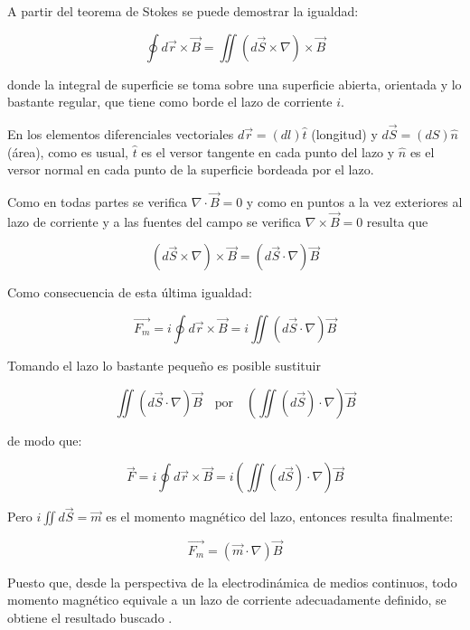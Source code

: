 A partir del teorema de Stokes se puede demostrar la igualdad: 

\begin{equation*}
\oint d\overrightarrow{r}\times\overrightarrow{B}=\iint (d\overrightarrow{S}\times \nabla)\times\overrightarrow{B}
\end{equation*}

donde la integral de superficie se toma sobre una superficie abierta, orientada y lo bastante regular, que tiene como borde el lazo de corriente $i$. 

En los elementos diferenciales vectoriales $d\overrightarrow{r}=(dl)\hat{t}$ (longitud) y $d\overrightarrow{S}=(dS)\hat{n}$ (área), como es usual, $\hat{t}$ es el versor tangente en cada punto del lazo y $\hat{n}$ es el versor normal en cada punto de la superficie bordeada por el lazo. 

Como en todas partes se verifica $\nabla\cdot\overrightarrow{B}=0$ y como en puntos a la vez exteriores al lazo de corriente y a las fuentes del campo se verifica $\nabla \times \overrightarrow{B} = 0$ resulta que 

\begin{equation*}
(d\overrightarrow{S} \times \nabla ) \times \overrightarrow{B} = (d\overrightarrow{S} \cdot \nabla ) \overrightarrow{B}
\end{equation*} 

Como consecuencia de esta última igualdad: 

\begin{equation*}
\overrightarrow{F_{m}}=i\oint d\overrightarrow{r}\times\overrightarrow{B} = i \iint (d\overrightarrow{S} \cdot \nabla)\overrightarrow{B}
\end{equation*}

Tomando el lazo lo bastante pequeño es posible sustituir 

\begin{equation*}
\iint (d\overrightarrow{S} \cdot \nabla)\overrightarrow{B}\quad \text{por}\quad \left( \iint (d\overrightarrow{S}) \cdot \nabla\right) \overrightarrow{B}
\end{equation*}

de modo que: 

\begin{equation*}
\overrightarrow{F}=i\oint d\overrightarrow{r} \times \overrightarrow{B} = i \left( \iint (d\overrightarrow{S}) \cdot \nabla\right) \overrightarrow{B} 
\end{equation*}


Pero $i\iint d\overrightarrow{S} = \overrightarrow{m}$ es el momento magnético del lazo, entonces resulta finalmente: 

\begin{equation*}
\overrightarrow{F_{m}}=(\overrightarrow{m}\cdot\nabla)\overrightarrow{B} 
\end{equation*}

Puesto que, desde la perspectiva de la electrodinámica de medios continuos, todo momento magnético equivale a un lazo de corriente adecuadamente definido, se obtiene el resultado buscado \citep{Kompaneyets}\citep{Landau8}.